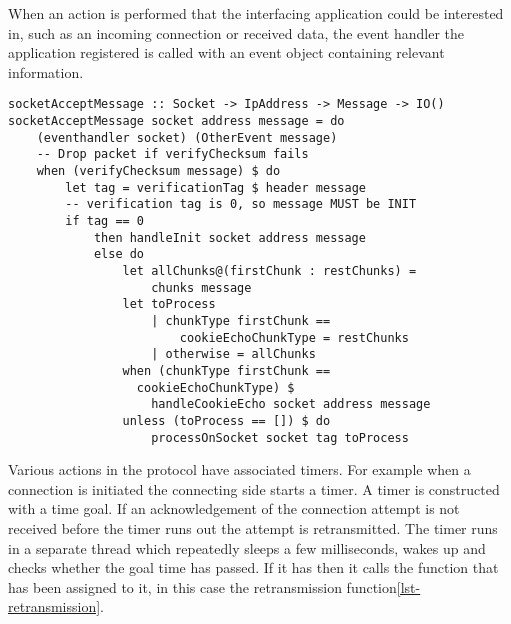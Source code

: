 When an action is performed that the interfacing application could be interested in, such as an incoming connection or received data, the event handler the application registered is called with an event object containing relevant information.

\begin{lstlisting}[caption={socketAcceptMessage decides what to do with a message},label={lst-socketacceptmessage}]
socketAcceptMessage :: Socket -> IpAddress -> Message -> IO()
socketAcceptMessage socket address message = do
    (eventhandler socket) (OtherEvent message)
    -- Drop packet if verifyChecksum fails
    when (verifyChecksum message) $ do
        let tag = verificationTag $ header message
        -- verification tag is 0, so message MUST be INIT
        if tag == 0 
            then handleInit socket address message
            else do
                let allChunks@(firstChunk : restChunks) =
                    chunks message
                let toProcess
                    | chunkType firstChunk ==
                        cookieEchoChunkType = restChunks
                    | otherwise = allChunks
                when (chunkType firstChunk == 
                  cookieEchoChunkType) $
                    handleCookieEcho socket address message
                unless (toProcess == []) $ do
                    processOnSocket socket tag toProcess
\end{lstlisting}

Various actions in the protocol have associated timers. For example when a connection is initiated the connecting side starts a timer. A timer is constructed with a time goal. If an acknowledgement of the connection attempt is not received before the timer runs out the attempt is retransmitted.
The timer runs in a separate thread which repeatedly sleeps a few milliseconds, wakes up and checks whether the goal time has passed. If it has then it calls the function that has been assigned to it, in this case the retransmission function\ref{lst-retransmission}.

